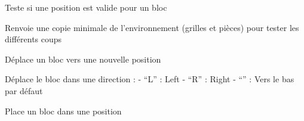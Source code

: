 \documentclass[letterpaper,10pt,french]{sphinxmanual}
\begin{document}
\begin{fulllineitems}
\begin{fulllineitems}
\end{fulllineitems}


\begin{fulllineitems}
\label{\detokenize{index:tetris_engine.TetrisEngine.isMoveValid}}
Teste si une position est valide pour un bloc

\end{fulllineitems}


\begin{fulllineitems}
\label{\detokenize{index:tetris_engine.TetrisEngine.minimalCopy}}
Renvoie une copie minimale de l’environnement
(grilles et pièces) pour tester les différents coups

\end{fulllineitems}


\begin{fulllineitems}
\label{\detokenize{index:tetris_engine.TetrisEngine.moveBlock}}
Déplace un bloc vers une nouvelle position

\end{fulllineitems}


\begin{fulllineitems}
\label{\detokenize{index:tetris_engine.TetrisEngine.moveBlockInDirection}}
Déplace le bloc dans une direction :
- “L” : Left
- “R” : Right
- “” : Vers le bas par défaut

\end{fulllineitems}


\begin{fulllineitems}
\label{\detokenize{index:tetris_engine.TetrisEngine.placeBlock}}
Place un bloc dans une position


\end{fulllineitems}
\end{fulllineitems}
\end{document}
